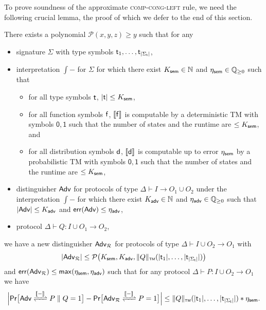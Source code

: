 
\noindent To prove soundness of the approximate \textsc{comp-cong-left} rule, we need the following crucial lemma, the proof of which we defer to the end of this section.

\begin{lemma}[Absorption]\label{lem:absorption}
There exists a polynomial $\mathcal{P}(x,y,z) \geq y$ such that for any
\begin{itemize}
\item \ipdl signature $\Sigma$ with type symbols $\mathsf{t}_1,\ldots,\mathsf{t}_{|\Sigma_\mathsf{t}|}$,

\item interpretation $\int{-}$ for $\Sigma$ for which there exist $K_{\mathsf{sem}} \in \mathbb{N}$ and $\eta_{\mathsf{sem}} \in \mathbb{Q}_{\geq 0}$ such that
\begin{itemize}
\item for all type symbols $\mathsf{t}$, $|\mathsf{t}| \leq K_{\mathsf{sem}}$,

\item for all function symbols $\mathsf{f}$, $\llbracket \mathsf{f} \rrbracket$ is computable by a deterministic TM with symbols $\mathsf{0}, \mathsf{1}$ such that the number of states and the runtime are $\leq K_{\mathsf{sem}}$, and

\item for all distribution symbols $\mathsf{d}$, $\llbracket \mathsf{d} \rrbracket$ is computable up to error $\eta_{\mathsf{sem}}$ by a probabilistic TM with symbols $\mathsf{0}, \mathsf{1}$ such that the number of states and the runtime are $\leq K_{\mathsf{sem}}$,
\end{itemize}

\item distinguisher $\mathsf{Adv}$ for protocols of type $\Delta \vdash I \to O_1 \cup O_2$ under the interpretation $\int{-}$ for which there exist $K_{\mathsf{adv}} \in \mathbb{N}$ and $\eta_{\mathsf{adv}} \in \mathbb{Q}_{\geq 0}$ such that $|\mathsf{Adv}| \leq K_{\mathsf{adv}}$ and $\mathsf{err}(\mathsf{Adv}) \leq \eta_{\mathsf{adv}}$,

\item protocol $\Delta \vdash Q : I \cup O_1 \to O_2$,
\end{itemize}
we have a new distinguisher $\mathsf{Adv}_\mathcal{R}$ for protocols of type $\Delta \vdash I \cup O_2 \to O_1$ with
\[|\mathsf{Adv}_\mathcal{R}| \leq \mathcal{P}\big(K_{\mathsf{sem}},K_{\mathsf{adv}},\Vert Q \Vert_{\scriptscriptstyle \mathsf{TM}}(|\mathsf{t}_1|,\ldots,|\mathsf{t}_{|\Sigma_\mathsf{t}|}|)\big)\]
and $\mathsf{err}(\mathsf{Adv}_\mathcal{R}) \leq \mathsf{max}(\eta_{\mathsf{sem}},\eta_{\mathsf{adv}})$ such that for any protocol $\Delta \vdash P : I \cup O_2 \to O_1$ we have
\[\Big|\mathsf{Pr}\big[\interaction{\Adv}{\Par{P}{Q}}{\int{-}} = 1\big] - \mathsf{Pr}\big[\interaction{\Adv_\mathcal{R}}{P}{\int{-}} = 1\big]\Big| \leq \tmnorm{Q}(|\type_1|,\ldots,|\type_{|\Sigma_\mathsf{t}|}|) * \eta_\sem.\]
\end{lemma}

